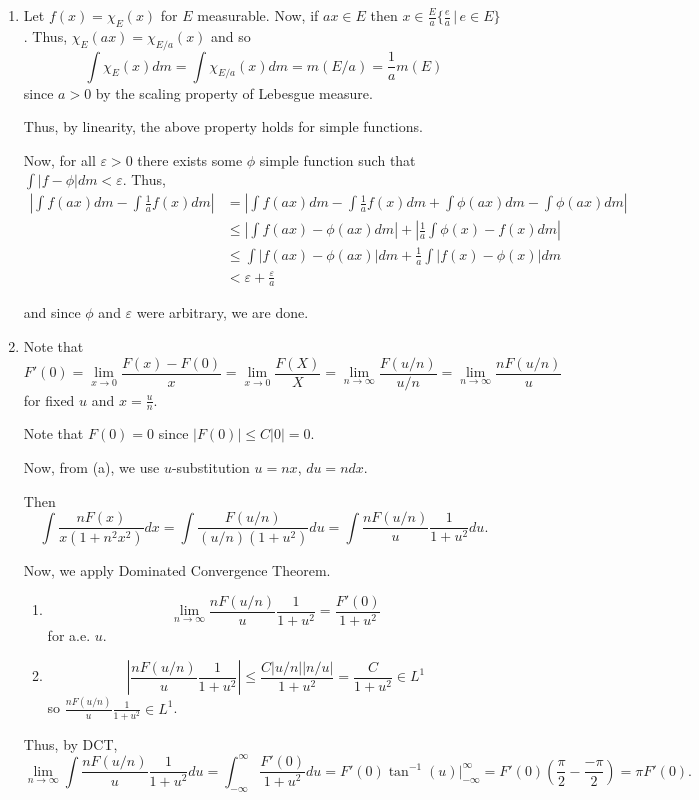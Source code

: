 \documentclass[12pt]{Qual}
\begin{document}
\begin{solution}$\,$
\begin{enumerate}[label=(\alph*)]
    \item Let $f(x)=\chi_E(x)$ for $E$ measurable. Now, if $ax\in E$ then $x\in\frac{E}{a}\{\frac{e}{a}\,|\,e\in E\}$. Thus, $\chi_E(ax)=\chi_{E/a}(x)$ and so $$\int\chi_E(x)dm=\int\chi_{E/a}(x)dm=m(E/a)=\frac{1}{a}m(E)$$ since $a>0$ by the scaling property of Lebesgue measure.

    Thus, by linearity, the above property holds for simple functions.

    Now, for all $\varepsilon>0$ there exists some $\phi$ simple function such that $\int|f-\phi|dm<\varepsilon$. Thus,
    \begin{align*}
        \left|\int f(ax)dm-\int\frac{1}{a}f(x)dm\right|&=\left|\int f(ax)dm-\int\frac{1}{a}f(x)dm+\int\phi(ax)dm-\int\phi(ax)dm\right|\\
        &\le\left|\int f(ax)-\phi(ax)dm\right|+\left|\frac{1}{a}\int\phi(x)-f(x)dm \right|\\
        &\le\int|f(ax)-\phi(ax)|dm+\frac{1}{a}\int|f(x)-\phi(x)|dm\\
        &<\varepsilon+\frac{\varepsilon}{a}
    \end{align*}

    and since $\phi$ and $\varepsilon$ were arbitrary, we are done.
    \item Note that $$F'(0)=\lim_{x\to0}\frac{F(x)-F(0)}{x}=\lim_{x\to0}\frac{F(X)}{X}=\lim_{n\to\infty}\frac{F(u/n)}{u/n}=\lim_{n\to\infty}\frac{nF(u/n)}{u}$$ for fixed $u$ and $x=\frac{u}{n}$.

    Note that $F(0)=0$ since $|F(0)|\le C|0|=0.$

    Now, from (a), we use $u$-substitution $u=nx$, $du=ndx$.

    Then $$\int\frac{nF(x)}{x(1+n^2x^2)}dx=\int\frac{F(u/n)}{(u/n)(1+u^2)}du=\int\frac{nF(u/n)}{u}\frac{1}{1+u^2}du.$$

    Now, we apply Dominated Convergence Theorem.
    \begin{enumerate}[label=(\roman*)]
        \item $$\lim_{n\to\infty}\frac{nF(u/n)}{u}\frac{1}{1+u^2}=\frac{F'(0)}{1+u^2}$$ for a.e. $u$.
        \item $$\left|\frac{nF(u/n)}{u}\frac{1}{1+u^2}\right|\le\frac{C|u/n||n/u|}{1+u^2}=\frac{C}{1+u^2}\in L^1$$ so $\frac{nF(u/n)}{u}\frac{1}{1+u^2}\in L^1$.
    \end{enumerate}
Thus, by DCT, $$\lim_{n\to\infty}\int\frac{nF(u/n)}{u}\frac{1}{1+u^2}du=\int_{-\infty}^\infty\frac{F'(0)}{1+u^2}du=F'(0)\tan^{-1}(u)\bigg|_{-\infty}^\infty=F'(0)(\frac{\pi}{2}-\frac{-\pi}{2})=\pi F'(0).$$
\end{enumerate}
\end{solution}
\newpage
\end{document}
